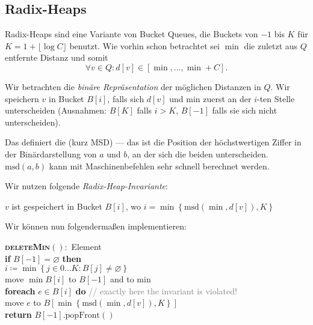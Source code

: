 \subsection{Radix-Heaps}

Radix-Heaps sind eine Variante von Bucket Queues, die Buckets von \( -1 \) bis \( K \) für \( K = 1 + \lfloor \log C \rfloor \) benutzt. Wie vorhin schon betrachtet sei \( \min \) die zuletzt aus \( Q \) entfernte Distanz und somit
\begin{equation*}
  \forall v \in Q : d[v] \in [\min,\dots,\min+C]\text{.}
\end{equation*}

Wir betrachten die \emph{binäre Repräsentation} der möglichen Distanzen in \( Q \). Wir speichern \( v \) in Bucket \( B[i] \), falls sich \( d[v] \) und min zuerst an der \( i \)-ten Stelle unterscheiden (Ausnahmen: \( B[K] \) falls \( i > K \), \( B[-1] \) falls sie sich nicht unterscheiden).

Das definiert die  (kurz MSD) --- das ist die Position der höchstwertigen Ziffer in der Binärdarstellung von \( a \) und \( b \), an der sich die beiden unterscheiden. \( \text{msd}(a,b) \) kann mit Maschinenbefehlen sehr schnell berechnet werden.

Wir nutzen folgende \emph{Radix-Heap-Invariante}:

\begin{center}
  \( v \) ist gespeichert in Bucket \( B[i] \), wo \( i = \min\left \{ \text{msd}(\min,d[v]),K \right \} \)
\end{center}

Wir können nun  folgendermaßen implementieren:

\begin{pseudocode}
  \textbf{\textsc{deleteMin}}\( () : \) Element \\
  \textbf{if} \( B[-1] = \varnothing \) \textbf{then} \\
  \phantom{\enskip} \( i \coloneqq \min\left \{ j \in 0\dots K : B[j] \neq \varnothing \right \} \) \\
  \phantom{\enskip} move \( \min B[i] \) to \( B[-1] \) and to min \\
  \phantom{\enskip} \textbf{foreach} \( e \in B[i] \) \textbf{do} \enskip{} \textcolor{gray}{// exactly here the invariant is violated!} \\
  \phantom{\enskip} \phantom{\enskip} move \( e \) to \( B[\min\left \{ \text{msd}(\min, d[v]), K \right \}] \) \\
  \textbf{return} \( B[-1]\text{.popFront}() \)
\end{pseudocode}


